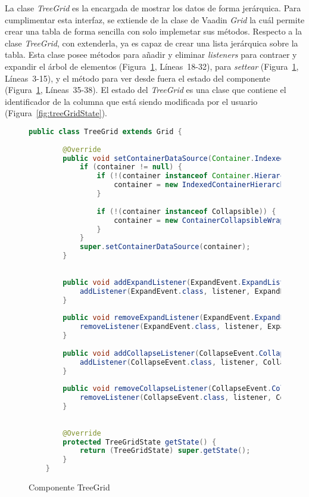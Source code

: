 La clase \emph{TreeGrid} es la encargada de mostrar los datos de forma jerárquica. Para cumplimentar esta interfaz, se extiende de la clase de Vaadin \emph{Grid} la cuál permite crear una tabla de forma sencilla con solo implemetar sus métodos. Respecto a la clase \emph{TreeGrid}, con extenderla, ya es capaz de crear una lista jerárquica sobre la tabla. Esta clase posee métodos para añadir y eliminar \emph{listeners} para contraer y expandir el árbol de elementos (Figura~\ref{fig:treeGrid}, Líneas~18-32), para \emph{settear} (Figura~\ref{fig:treeGrid}, Líneas~3-15), y el método para ver desde fuera el estado del componente (Figura~\ref{fig:treeGrid}, Líneas~35-38). El estado del \emph{TreeGrid} es una clase que contiene el identificador de la columna que está siendo modificada por el usuario (Figura~\ref{fig:treeGridState}).


\begin{figure}[!tb]
	\centering
	\begin{lstlisting}[language=Java]
	public class TreeGrid extends Grid {
		
		@Override
		public void setContainerDataSource(Container.Indexed container) {
			if (container != null) {
				if (!(container instanceof Container.Hierarchical)) {
					container = new IndexedContainerHierarchicalWrapper(container);
				}
				
				if (!(container instanceof Collapsible)) {
					container = new ContainerCollapsibleWrapper(container);
				}
			}
			super.setContainerDataSource(container);
		}
		
		
		public void addExpandListener(ExpandEvent.ExpandListener listener) {
			addListener(ExpandEvent.class, listener, ExpandEvent.ExpandListener.EXPAND_METHOD);
		}
		
		public void removeExpandListener(ExpandEvent.ExpandListener listener) {
			removeListener(ExpandEvent.class, listener, ExpandEvent.ExpandListener.EXPAND_METHOD);
		}
		
		public void addCollapseListener(CollapseEvent.CollapseListener listener) {
			addListener(CollapseEvent.class, listener, CollapseEvent.CollapseListener.COLLAPSE_METHOD);
		}
		
		public void removeCollapseListener(CollapseEvent.CollapseListener listener) {
			removeListener(CollapseEvent.class, listener, CollapseEvent.CollapseListener.COLLAPSE_METHOD);
		}
		
		
		@Override
		protected TreeGridState getState() {
			return (TreeGridState) super.getState();
		}
	}\end{lstlisting}
	\caption{Componente TreeGrid}
	\label{fig:treeGrid}
\end{figure}

